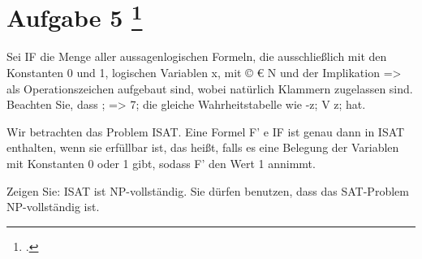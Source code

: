 \documentclass{lehramt-informatik-aufgabe}
\begin{document}
\liAufgabenTitel{}
\section{Aufgabe 5
\footcite{examen:66115:2020:09}}

Sei IF die Menge aller aussagenlogischen Formeln, die ausschließlich mit den Konstanten 0 und
1, logischen Variablen x, mit © € N und der Implikation => als Operationszeichen aufgebaut
sind, wobei natürlich Klammern zugelassen sind. Beachten Sie, dass ; => 7; die gleiche
Wahrheitstabelle wie -z; V z; hat.

Wir betrachten das Problem ISAT. Eine Formel F' e IF ist genau dann in ISAT enthalten, wenn
sie erfüllbar ist, das heißt, falls es eine Belegung der Variablen mit Konstanten 0 oder 1 gibt,
sodass F' den Wert 1 annimmt.

Zeigen Sie: ISAT ist NP-vollständig. Sie dürfen benutzen, dass das SAT-Problem NP-vollständig
ist.
\end{document}
